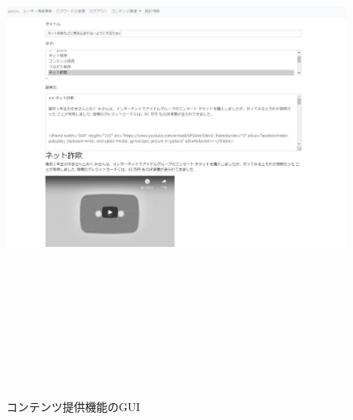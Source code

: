 \begin{figure}[htbp]
    \begin{center}
        \includegraphics[width=18cm,height=17cm,keepaspectratio]{create_content-crop.pdf}\\
    \end{center}
    \caption{コンテンツ提供機能のGUI}
    \label{teikyou}
\end{figure}

